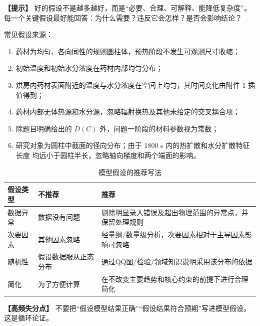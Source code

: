 \documentclass[12pt,a4paper]{article}
\newcommand{\tip}[1]{\par\noindent\textbf{【提示】} #1\par}
\newcommand{\warning}[1]{\par\noindent\textbf{【高频失分点】} #1\par}
\begin{document}
\tip{好的假设不是越多越好，而是“必要、合理、可解释、能降低复杂度”。每一个关键假设最好能回答：为什么需要？违反它会怎样？是否会影响结论？} 常见假设来源：
\begin{enumerate}[label=(\arabic*)]
  \item 药材为均匀、各向同性的规则圆柱体，预热阶段不发生可观测尺寸收缩；
  \item 初始温度和初始水分浓度在药材内部均匀分布；
  \item 烘房内药材表面附近的温度与水分浓度在空间上均匀，其时间变化由附件 1 插值得到；
  \item 药材内部无体热源和水分源，忽略辐射换热及其他未给定的交叉耦合项；
  \item 除题目明确给出的 $D(C)$ 外，问题一阶段的材料参数视为常数；
  \item 研究对象为圆柱中截面的径向分布；由于 1800 s 内的热扩散和水分扩散特征长度
  均远小于圆柱半长，忽略轴向梯度和两个端面的影响。
\end{enumerate}
\begin{table}[H]
\centering
\caption{模型假设的推荐写法}
\begin{tabular}{p{2cm}p{5cm}p{6cm}}
\toprule
假设类型 & 不推荐 & 推荐 \\
\midrule
数据异常 & 数据没有问题 & 剔除明显录入错误及超出物理范围的异常点，并保留处理规则 \\
次要因素 & 其他因素忽略 & 经量纲/数量级分析，次要因素相对于主导因素影响可忽略 \\
随机性 & 假设数据服从正态分布 & 通过QQ图/检验/领域知识说明采用该分布的依据 \\
简化 & 为了方便计算 & 在不改变主要趋势和核心约束的前提下进行合理简化 \\
\bottomrule
\end{tabular}
\end{table}

\warning{不要把“假设模型结果正确”“假设结果符合预期”写进模型假设。这是循环论证。}
\end{document}

